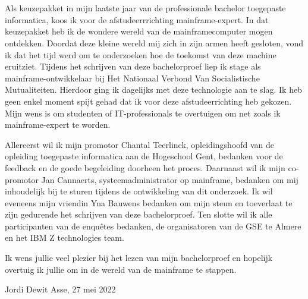 
\chapter*{}
\label{ch:voorwoord}


Als keuzepakket in mijn laatste jaar van de professionale bachelor toegepaste informatica, koos ik  voor de afstudeerrrichting mainframe-expert. In dat keuzepakket heb ik de wondere wereld van de mainframecomputer mogen ontdekken. Doordat deze kleine wereld mij zich in zijn armen heeft gesloten, vond ik dat het tijd werd om te onderzoeken hoe de toekomst van deze machine eruitziet. Tijdens het schrijven van deze bachelorproef liep ik stage als mainframe-ontwikkelaar bij Het Nationaal Verbond Van Socialistische Mutualiteiten. Hierdoor ging ik dagelijks met deze technologie aan te slag. Ik heb geen enkel moment spijt gehad dat ik voor deze afstudeerrichting heb gekozen. Mijn wens is om studenten of IT-professionals te overtuigen om net zoals ik mainframe-expert te worden. 

Allereerst wil ik mijn promotor Chantal Teerlinck, opleidingshoofd van de opleiding toegepaste informatica aan de Hogeschool Gent, bedanken voor de feedback en de goede begeleiding doorheen het proces. Daarnaast wil ik mijn co-promotor Jan Cannaerts,  systeemadministrator op mainframe, bedanken om mij inhoudelijk bij te sturen tijdens de ontwikkeling van dit onderzoek. Ik wil eveneens mijn vriendin Yna Bauwens bedanken om mijn steun en toeverlaat te zijn gedurende het schrijven van deze bachelorproef. Ten slotte wil ik alle participanten van de enquêtes bedanken, de organisatoren van de GSE te Almere en het IBM Z technologies team. 

Ik wens jullie veel plezier bij het lezen van mijn bachelorproef en hopelijk overtuig ik jullie om in de wereld van de mainframe te stappen. 

Jordi Dewit \newline
Asse, 27 mei 2022